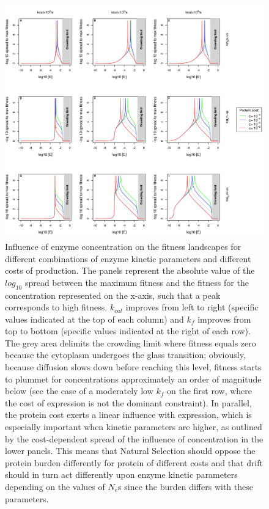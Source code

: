 \begin{figure}[h!]
\centering
\hspace{-0.5cm}
\includegraphics[scale=0.6,trim=0cm 0cm 0cm 0cm,clip]{pics/SM-Enzymes/1DFit_Lanscape_Scaling_Concentration.jpeg} 
\caption{Influence of enzyme concentration on the fitness landscapes for different combinations of enzyme kinetic parameters and different costs of production. The panels represent the absolute value of the $log_{10}$ spread between the maximum fitness and the fitness for the concentration represented on the x-axis, such that a peak corresponds to high fitness. $k_{cat}$ improves from left to right (specific values indicated at the top of each column) and $k_f$ improves from top to bottom (specific values indicated at the right of each row). The grey area delimits the crowding limit where fitness equals zero because the cytoplasm undergoes the glass transition; obviously, because diffusion slows down before reaching this level, fitness starts to plummet for concentrations approximately an order of magnitude below (see the case of a moderately low $k_f$ on the first row, where the cost of expression is not the dominant constraint). In parallel, the protein cost exerts a linear influence with expression, which is especially important when kinetic parameters are higher, as outlined by the cost-dependent spread of the influence of concentration in the lower panels. This means that Natural Selection should oppose the protein burden differently for protein of different costs and that drift should in turn act differently upon enzyme kinetic parameters depending on the values of $N_e$s since the burden differs with these parameters.}

\end{figure}
